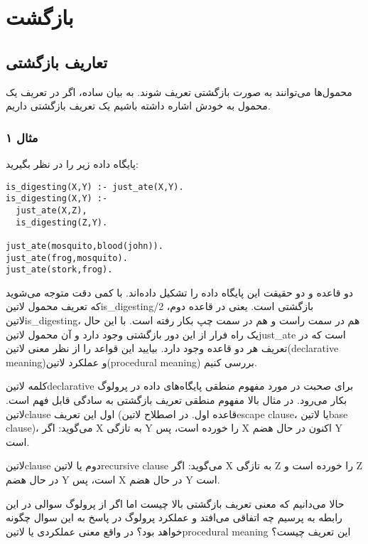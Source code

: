 \chapter{بازگشت}

\section{تعاریف بازگشتی}
محمول‌ها می‌توانند به صورت بازگشتی تعریف شوند. به بیان ساده، اگر در تعریف یک محمول به خودش اشاره داشته باشیم یک تعریف بازگشتی داریم.

\subsection{مثال ۱}
پایگاه داده زیر را در نظر بگیرید:

\begin{latin}
\begin{lstlisting}
is_digesting(X,Y) :- just_ate(X,Y).
is_digesting(X,Y) :-
  just_ate(X,Z),
  is_digesting(Z,Y).

just_ate(mosquito,blood(john)).
just_ate(frog,mosquito).
just_ate(stork,frog).
\end{lstlisting}
\end{latin}

دو قاعده و دو حقیقت این پایگاه داده را تشکیل داده‌اند. با کمی دقت متوجه می‌شوید که تعریف محمول ‌لاتین{is\_digesting/2} بازگشتی است. یعنی در قاعده دوم، ‌لاتین{is\_digesting}، هم در سمت راست و هم در سمت چپ بکار رفته است. با این حال یک راه فرار از این دور بازگشتی وجود دارد و آن محمول ‌لاتین{just\_ate} است که در تعریف هر دو قاعده وجود دارد. بیایید این قواعد را از نظر معنی ‌لاتین{(declarative meaning)}و عملکرد ‌لاتین{(procedural meaning)} بررسی کنیم.

کلمه ‌لاتین{declarative} برای صحبت در مورد مفهوم منطقی پایگاه‌های داده در پرولوگ بکار می‌رود. در مثال بالا مفهوم منطقی تعریف بازگشتی به سادگی قابل فهم است. ‌لاتین{clause} اول این تعریف (قاعده اول. در اصطلاح ‌لاتین{escape clause}، یا ‌لاتین{base clause})، می‌گوید: اگر X به تازگی Y را خورده است، پس X اکنون در حال هضم Y است.

‌لاتین{clause} دوم یا ‌لاتین{recursive clause} می‌گوید: اگر X به تازگی Z را خورده است و Z در حال هضم Y است، پس X در حال هضم Y است.

حالا می‌دانیم که معنی تعریف بازگشتی بالا چیست اما اگر از پرولوگ سوالی در این رابطه به پرسیم چه اتفاقی می‌افتد و عملکرد پرولوگ در پاسخ به این سوال چگونه خواهد بود؟ در واقع معنی عملکردی یا ‌لاتین{procedural meaning} این تعریف چیست؟


